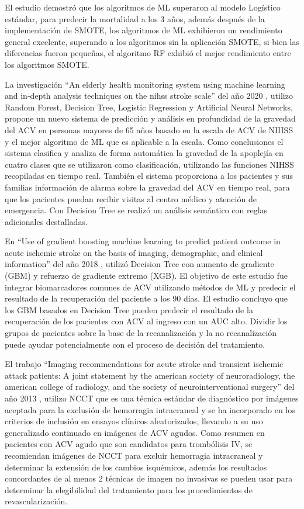 El estudio demostró que los algoritmos de ML superaron al modelo Logístico estándar, para predecir la mortalidad a los 3 años, además después de la implementación de SMOTE, los algoritmos de ML exhibieron un rendimiento general excelente, superando a los algoritmos sin la aplicación SMOTE, si bien las diferencias fueron pequeñas, el algoritmo RF exhibió el mejor rendimiento entre los algoritmos SMOTE.\\
\par La investigación “An elderly health monitoring system using machine learning and in-depth analysis techniques on the nihss stroke scale” del año 2020 \cite{Yu2020}, utilizo Random Forest, Decision Tree, Logistic Regression y Artificial Neural Networks, propone un nuevo sistema de predicción y análisis en profundidad de la gravedad del ACV en personas mayores de 65 años basado en la escala de ACV de NIHSS y el mejor algoritmo de ML que es aplicable a la escala. Como conclusiones el sistema clasifica y analiza de forma automática la gravedad de la apoplejía en cuatro clases que se utilizaron como clasificación, utilizando las funciones NIHSS recopiladas en tiempo real. También el sistema proporciona a los pacientes y sus familias información de alarma sobre la gravedad del ACV en tiempo real, para que los pacientes puedan recibir visitas al centro médico y atención de emergencia. Con Decision Tree se realizó un análisis semántico con reglas adicionales destalladas.\\
\par En “Use of gradient boosting machine learning to predict patient outcome in acute ischemic stroke on the basis of imaging, demographic, and clinical information” del año 2018 \cite{Xie2018}, utilizó Decision Tree con aumento de gradiente (GBM) y refuerzo de gradiente extremo (XGB). El objetivo de este estudio fue integrar biomarcadores comunes de ACV utilizando métodos de ML y predecir el resultado de la recuperación del paciente a los 90 días. El estudio concluyo que los GBM basados en Decision Tree pueden predecir el resultado de la recuperación de los pacientes con ACV al ingreso con un AUC alto. Dividir los grupos de pacientes sobre la base de la recanalización y la no recanalización puede ayudar potencialmente con el proceso de decisión del tratamiento.\\
\par El trabajo “Imaging recommendations for acute stroke and transient ischemic attack patients: A joint statement by the american society of neuroradiology, the american college of radiology, and the society of neurointerventional surgery” del año 2013 \cite{Wintermark2013}, utilizo NCCT que es una técnica estándar de diagnóstico por imágenes aceptada para la exclusión de hemorragia intracraneal y se ha incorporado en los criterios de inclusión en ensayos clínicos aleatorizados, llevando a su uso generalizado continuado en imágenes de ACV  agudos. Como resumen en pacientes con ACV agudo que son candidatos para trombólisis IV, se recomiendan imágenes de NCCT para excluir hemorragia intracraneal y determinar la extensión de los cambios isquémicos, además los resultados concordantes de al menos 2 técnicas de imagen no invasivas se pueden usar para determinar la elegibilidad del tratamiento para los procedimientos de revascularización.\\
